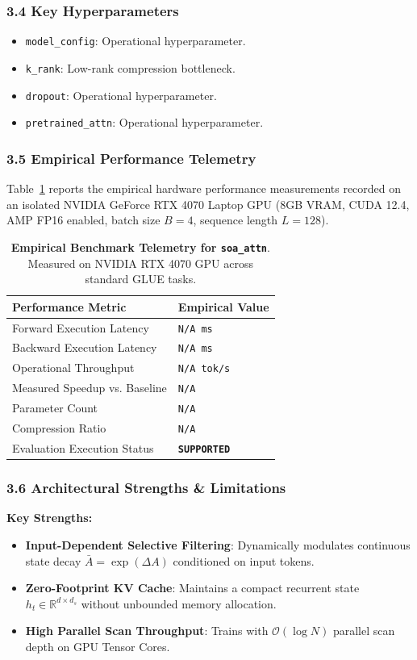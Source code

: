 \subsubsection*{3.4 Key Hyperparameters}
\begin{itemize}
    \item \texttt{model\_config}: Operational hyperparameter.
    \item \texttt{k\_rank}: Low-rank compression bottleneck.
    \item \texttt{dropout}: Operational hyperparameter.
    \item \texttt{pretrained\_attn}: Operational hyperparameter.
\end{itemize}

\subsubsection*{3.5 Empirical Performance Telemetry}
Table~\ref{tab:telemetry_soa\_attn} reports the empirical hardware performance measurements recorded on an isolated NVIDIA GeForce RTX 4070 Laptop GPU (8GB VRAM, CUDA 12.4, AMP FP16 enabled, batch size $B=4$, sequence length $L=128$).

\begin{table}[h]
\centering
\small
\caption{\textbf{Empirical Benchmark Telemetry for \texttt{soa\_attn}}. Measured on NVIDIA RTX 4070 GPU across standard GLUE tasks.}
\label{tab:telemetry_soa\_attn}
\begin{tabularx}{\columnwidth}{lX}
\toprule
\textbf{Performance Metric} & \textbf{Empirical Value} \\
\midrule
Forward Execution Latency & \texttt{N/A ms} \\
Backward Execution Latency & \texttt{N/A ms} \\
Operational Throughput & \texttt{N/A tok/s} \\
Measured Speedup vs. Baseline & \texttt{N/A} \\
Parameter Count & \texttt{N/A} \\
Compression Ratio & \texttt{N/A} \\
Evaluation Execution Status & \textbf{\texttt{SUPPORTED}} \\
\bottomrule
\end{tabularx}
\end{table}

\subsubsection*{3.6 Architectural Strengths \& Limitations}
\textbf{Key Strengths:}
\begin{itemize}
    \item \textbf{Input-Dependent Selective Filtering}: Dynamically modulates continuous state decay $\bar{A} = \exp(\Delta A)$ conditioned on input tokens.
    \item \textbf{Zero-Footprint KV Cache}: Maintains a compact recurrent state $h_t \in \mathbb{R}^{d \times d_s}$ without unbounded memory allocation.
    \item \textbf{High Parallel Scan Throughput}: Trains with $\mathcal{O}(\log N)$ parallel scan depth on GPU Tensor Cores.
\end{itemize}

